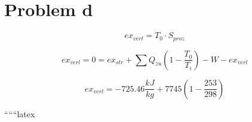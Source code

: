 \section*{Problem d}

\[
ex_{verl} = T_0 \cdot S_{proz}
\]

\[
ex_{verl} = 0 = ex_{str} + \sum Q_{zu} \left( 1 - \frac{T_0}{T_i} \right) - W - ex_{verl}
\]

\[
ex_{verl} = -725.46 \frac{kJ}{kg} + 7745 \left( 1 - \frac{253}{298} \right)
\]

``````latex